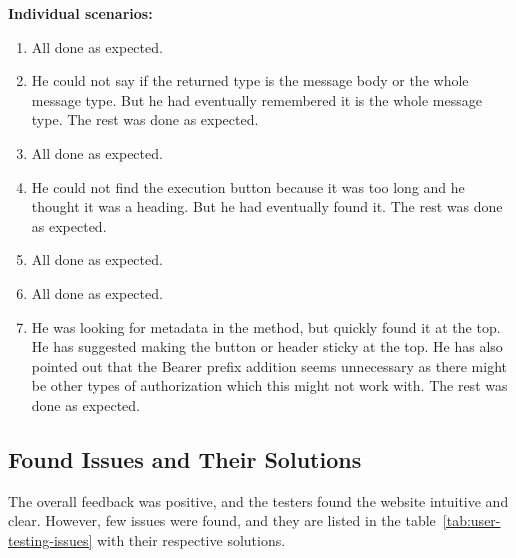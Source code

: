 \textbf{Individual scenarios:}
\begin{enumerate}
    \item All done as expected.
    \item He could not say if the returned type is the message body or the whole message type.
    But he had eventually remembered it is the whole message type.
    The rest was done as expected.
    \item All done as expected.
    \item He could not find the execution button because it was too long and he thought it was a heading.
    But he had eventually found it.
    The rest was done as expected.
    \item All done as expected.
    \item All done as expected.
    \item He was looking for metadata in the method, but quickly found it at the top.
    He has suggested making the button or header sticky at the top.
    He has also pointed out that the Bearer prefix addition seems unnecessary as there might be other types of authorization which this might not work with.
    The rest was done as expected.
\end{enumerate}

\subsection{Found Issues and Their Solutions}\label{subsec:found-issues-and-their-solutions}
The overall feedback was positive, and the testers found the website intuitive and clear.
However, few issues were found, and they are listed in the table~\ref{tab:user-testing-issues} with their respective solutions.


